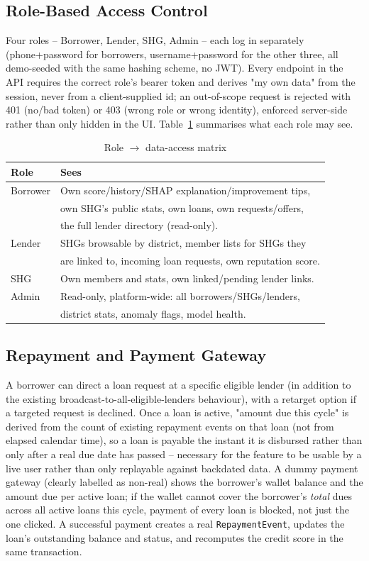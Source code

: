 \documentclass[11pt,a4paper]{article}
\begin{document}
\subsection{Role-Based Access Control}
Four roles -- Borrower, Lender, SHG, Admin -- each log in separately
(phone+password for borrowers, username+password for the other three,
all demo-seeded with the same hashing scheme, no JWT). Every endpoint
in the API requires the correct role's bearer token and derives "my
own data" from the session, never from a client-supplied id; an
out-of-scope request is rejected with 401 (no/bad token) or 403 (wrong
role or wrong identity), enforced server-side rather than only hidden
in the UI. Table~\ref{tab:access-matrix} summarises what each role may
see.

\begin{table}[h]
\centering
\begin{tabular}{|l|l|}
\hline
\textbf{Role} & \textbf{Sees} \\
\hline
Borrower & Own score/history/SHAP explanation/improvement tips, \\
         & own SHG's public stats, own loans, own requests/offers, \\
         & the full lender directory (read-only). \\
\hline
Lender & SHGs browsable by district, member lists for SHGs they \\
       & are linked to, incoming loan requests, own reputation score. \\
\hline
SHG & Own members and stats, own linked/pending lender links. \\
\hline
Admin & Read-only, platform-wide: all borrowers/SHGs/lenders, \\
      & district stats, anomaly flags, model health. \\
\hline
\end{tabular}
\caption{Role $\to$ data-access matrix}
\label{tab:access-matrix}
\end{table}

\subsection{Repayment and Payment Gateway}
A borrower can direct a loan request at a specific eligible lender (in
addition to the existing broadcast-to-all-eligible-lenders behaviour),
with a retarget option if a targeted request is declined. Once a loan
is active, "amount due this cycle" is derived from the count of
existing repayment events on that loan (not from elapsed calendar
time), so a loan is payable the instant it is disbursed rather than
only after a real due date has passed -- necessary for the feature to
be usable by a live user rather than only replayable against backdated
data. A dummy payment gateway (clearly labelled as non-real) shows the
borrower's wallet balance and the amount due per active loan; if the
wallet cannot cover the borrower's \emph{total} dues across all active
loans this cycle, payment of every loan is blocked, not just the one
clicked. A successful payment creates a real \texttt{RepaymentEvent},
updates the loan's outstanding balance and status, and recomputes the
credit score in the same transaction.
\end{document}
